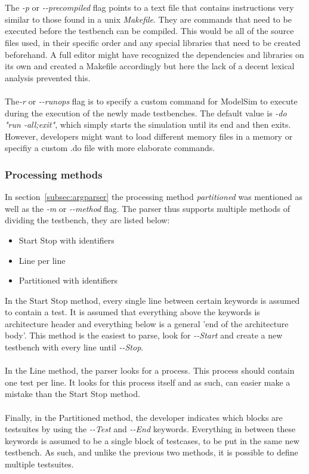 \documentclass[11pt,british]{article}
\begin{document}
\\
\\
The \emph{-p} or \emph{-\--precompiled} flag points to a text file that contains instructions very similar to those found in a unix \emph{Makefile}. They are commands that need to be executed before the testbench can be compiled. This would be all of the source files used, in their specific order and any special libraries that need to be created beforehand. A full editor might have recognized the dependencies and libraries on its own and created a Makefile accordingly but here the lack of a decent lexical analysis prevented this.
\\
\\
The\emph{-r} or \emph{-\--runops} flag is to specify a custom command for ModelSim to execute during the execution of the newly made testbenches. The default value is \emph{-do "run -all;exit"}, which simply starts the simulation until its end and then exits. However, developers might want to load different memory files in a memory or specifiy a custom .do file with more elaborate commands.

\subsubsection{Processing methods}
\label{subsubsec:processmethods}
In section~\ref{subsec:argparser} the processing method \emph{partitioned} was mentioned as well as the \emph{-m} or \emph{-\--method} flag. The parser thus supports multiple methods of dividing the testbench, they are listed below:
\begin{itemize}%
\item Start Stop with identifiers
\item Line per line 
\item Partitioned with identifiers
\end{itemize}
In the Start Stop method, every single line between certain keywords is assumed to contain a test. It is assumed that everything above the keywords is architecture header and everything below is a general 'end of the architecture body'. This method is the easiest to parse, look for \emph{-\--Start} and create a new testbench with every line until \emph{-\--Stop}.
\\
\\
In the Line method, the parser looks for a process. This process should contain one test per line. It looks for this process itself and as such, can easier make a mistake than the Start Stop method.
\\
\\
Finally, in the Partitioned method, the developer indicates which blocks are testsuites by using the \emph{-\--Test} and \emph{-\--End} keywords. Everything in between these keywords is assumed to be a single block of testcases, to be put in the same new testbench. As such, and unlike the previous two methods, it is possible to define multiple testsuites. 
\end{document}
